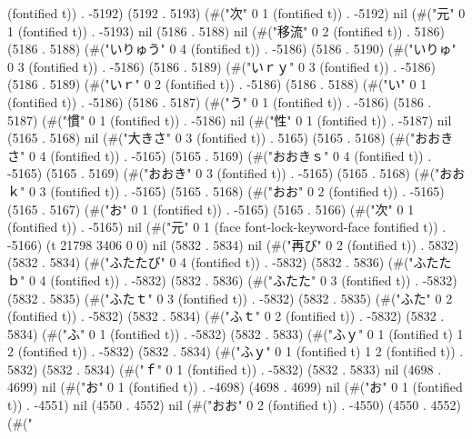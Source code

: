 (fontified t)) . -5192) (5192 . 5193) (#("次" 0 1 (fontified t)) . -5192) nil (#("元" 0 1 (fontified t)) . -5193) nil (5186 . 5188) nil (#("移流" 0 2 (fontified t)) . 5186) (5186 . 5188) (#("いりゅう" 0 4 (fontified t)) . -5186) (5186 . 5190) (#("いりゅ" 0 3 (fontified t)) . -5186) (5186 . 5189) (#("いｒｙ" 0 3 (fontified t)) . -5186) (5186 . 5189) (#("いｒ" 0 2 (fontified t)) . -5186) (5186 . 5188) (#("い" 0 1 (fontified t)) . -5186) (5186 . 5187) (#("う" 0 1 (fontified t)) . -5186) (5186 . 5187) (#("慣" 0 1 (fontified t)) . -5186) nil (#("性" 0 1 (fontified t)) . -5187) nil (5165 . 5168) nil (#("大きさ" 0 3 (fontified t)) . 5165) (5165 . 5168) (#("おおきさ" 0 4 (fontified t)) . -5165) (5165 . 5169) (#("おおきｓ" 0 4 (fontified t)) . -5165) (5165 . 5169) (#("おおき" 0 3 (fontified t)) . -5165) (5165 . 5168) (#("おおｋ" 0 3 (fontified t)) . -5165) (5165 . 5168) (#("おお" 0 2 (fontified t)) . -5165) (5165 . 5167) (#("お" 0 1 (fontified t)) . -5165) (5165 . 5166) (#("次" 0 1 (fontified t)) . -5165) nil (#("元" 0 1 (face font-lock-keyword-face fontified t)) . -5166) (t 21798 3406 0 0) nil (5832 . 5834) nil (#("再び" 0 2 (fontified t)) . 5832) (5832 . 5834) (#("ふたたび" 0 4 (fontified t)) . -5832) (5832 . 5836) (#("ふたたｂ" 0 4 (fontified t)) . -5832) (5832 . 5836) (#("ふたた" 0 3 (fontified t)) . -5832) (5832 . 5835) (#("ふたｔ" 0 3 (fontified t)) . -5832) (5832 . 5835) (#("ふた" 0 2 (fontified t)) . -5832) (5832 . 5834) (#("ふｔ" 0 2 (fontified t)) . -5832) (5832 . 5834) (#("ふ" 0 1 (fontified t)) . -5832) (5832 . 5833) (#("ふｙ" 0 1 (fontified t) 1 2 (fontified t)) . -5832) (5832 . 5834) (#("ふｙ" 0 1 (fontified t) 1 2 (fontified t)) . 5832) (5832 . 5834) (#("ｆ" 0 1 (fontified t)) . -5832) (5832 . 5833) nil (4698 . 4699) nil (#("お" 0 1 (fontified t)) . -4698) (4698 . 4699) nil (#("お" 0 1 (fontified t)) . -4551) nil (4550 . 4552) nil (#("おお" 0 2 (fontified t)) . -4550) (4550 . 4552) (#("
